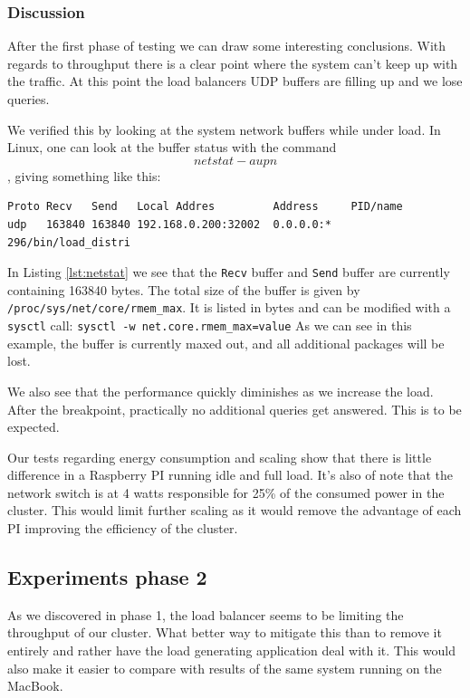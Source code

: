 \subsubsection{Discussion}
After the first phase of testing we can draw some interesting conclusions. With regards to throughput there is a clear point where the system can't keep up with the traffic. At this point the load balancers UDP buffers are filling up and we lose queries.

We verified this by looking at the system network buffers while under load. In Linux, one can look at the buffer status with the command $$netstat -aupn$$, giving something like this:
\begin{lstlisting}[caption={Output of {\tt netstat -aupn | grep 32002}},captionpos=b,label={lst:netstat}]
Proto Recv   Send   Local Addres         Address     PID/name
udp   163840 163840 192.168.0.200:32002  0.0.0.0:*   296/bin/load_distri
\end{lstlisting}
In Listing \ref{lst:netstat} we see that the {\tt Recv} buffer and {\tt Send} buffer are currently containing 163840 bytes.
The total size of the buffer is given by {\tt /proc/sys/net/core/rmem\_max}. It is listed in bytes and can be modified with a {\tt sysctl} call: {\tt sysctl -w net.core.rmem\_max=value}
As we can see in this example, the buffer is currently maxed out, and all additional packages will be lost.

We also see that the performance quickly diminishes as we increase the load. After the breakpoint, practically no additional queries get answered.
This is to be expected.

Our tests regarding energy consumption and scaling show that there is little difference in a Raspberry PI running idle and full load. It's also of note that the network switch is at 4 watts responsible for 25\% of the consumed power in the cluster. This would limit further scaling as it would remove the advantage of each PI improving the efficiency of the cluster.

\subsection{Experiments phase 2}
As we discovered in phase 1, the load balancer seems to be limiting the throughput of our cluster. What better way to mitigate this than to remove it entirely and rather have the load generating application deal with it. This would also make it easier to compare with results of the same system running on the MacBook.

